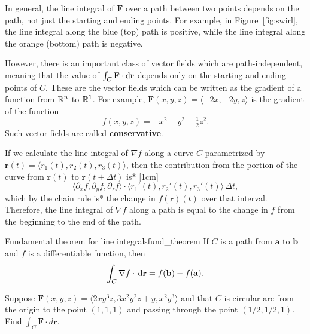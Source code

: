 \documentclass[svgnames]{watsonbook}
\begin{document}
In general, the line integral of $\mathbf{F}$ over a path between two
points depends on the path, not just the starting and ending points.
For example, in Figure~\ref{fig:swirl}, the line integral along the
blue (top) path is positive, while the line integral along the orange
(bottom) path is negative.

However, there is an important class of vector fields which are
path-independent, meaning that the value of $\int_C \mathbf{F} \cdot
\mathrm{d}\mathbf{r}$ depends only on the starting and ending points of $C$.
These are the vector fields which can be written as the gradient of a
function from $\mathbb{R}^n$ to $\mathbb{R}^1$. For example, $\mathbf{F}(x,y,z) =
\langle -2x, -2y, z \rangle$ is the gradient of the function
\[
  f(x,y,z) = -x^2-y^2 + \tfrac{1}{2}z^2. 
\]
Such vector fields are called \textbf{conservative}. 

If we calculate the line integral of $\nabla f$ along a curve $C$
parametrized by $\mathbf{r}(t) = \langle r_1(t), r_2(t), r_3(t) \rangle$,
then the contribution from the portion of the curve from
$\mathbf{r}(t)$ to $\mathbf{r}(t+\Delta t)$ is*
[1cm]
\[
  \langle \partial_x f, \partial_y f, \partial_z f \rangle \cdot
  \langle r_1'(t), r_2'(t), r_3'(t) \rangle \, \Delta t, 
\]
which by the chain rule is* the change in
$f(\mathbf{r})(t)$ over that interval. Therefore, the line
integral of $\nabla f$ along a path is equal to the change in $f$ from
the beginning to the end of the path.

\begin{theo}{Fundamental theorem for line integrals}{fund_theorem}
  If $C$ is a path from $\mathbf{a}$ to $\mathbf{b}$ and $f$ is a
  differentiable function, then 
  \[
    \int_C \nabla f \cdot \, {\mathrm{d}}\mathbf{r} = f(\mathbf{b}) - f(\mathbf{a}). 
  \]
\end{theo}

\begin{example}{}{}
  Suppose $\mathbf{F}(x,y,z) = \langle 2  x y^{3} z, 3  x^{2} y^{2}
  z + y, x^{2} y^{3} \rangle$ and that $C$ is circular arc from the
  origin to the point $(1,1,1)$ and passing through the point
  $(1/2,1/2,1)$. Find $\int_C \mathbf{F} \cdot d \mathbf{r}$. 
\end{example}
\end{document}
